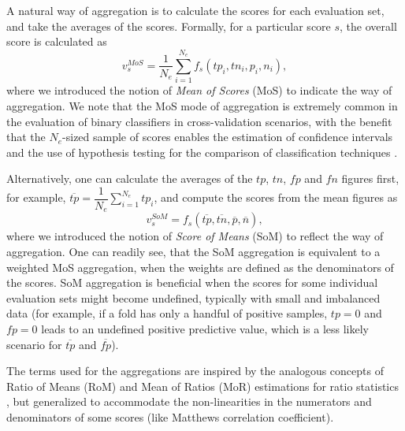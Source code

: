 \documentclass[5p, final]{elsarticle}
\begin{document}
A natural way of aggregation is to calculate the scores for each evaluation set, and take the averages of the scores. Formally, for a particular score $s$, the overall score is calculated as
\begin{equation}
\label{estmor}
v_s^{MoS} = \dfrac{1}{N_e}\sum\limits_{i=1}^{N_e} f_s(tp_{i}, tn_{i}, p_{i}, n_{i}),
\end{equation}
where we introduced the notion of \emph{Mean of Scores} (MoS) to indicate the way of aggregation. We note that the MoS mode of aggregation is extremely common in the evaluation of binary classifiers in cross-validation scenarios, with the benefit that the $N_e$-sized sample of scores enables the estimation of confidence intervals \cite{morex2} and the use of  hypothesis testing for the comparison of classification techniques \cite{morex0}.

Alternatively, one can calculate the averages of the $tp$, $tn$, $fp$ and $fn$ figures first, for example, $\overline{tp} = \dfrac{1}{N_e}\sum\limits_{i=1}^{N_e} tp_i$, and compute the scores from the mean figures as
\begin{equation}
\label{estrom}
v_s^{SoM} = f_s\left(\overline{tp}, \overline{tn}, \overline{p}, \overline{n}\right),
\end{equation}
where we introduced the notion of \emph{Score of Means} (SoM) to reflect the way of aggregation. One can readily see, that the SoM aggregation is equivalent to a weighted MoS aggregation, when the weights are defined as the denominators of the scores. SoM aggregation is beneficial when the scores for some individual evaluation sets might become undefined, typically with small and imbalanced data \cite{romex0} (for example, if a fold has only a handful of positive samples, $tp=0$ and $fp=0$ leads to an undefined positive predictive value, which is a less likely scenario for $\overline{tp}$ and $\overline{fp}$).

The terms used for the aggregations are inspired by the analogous concepts of Ratio of Means (RoM) and Mean of Ratios (MoR) estimations for ratio statistics \cite{rommor, rommor2}, but generalized to accommodate the non-linearities in the numerators and denominators of some scores (like Matthews correlation coefficient).
\end{document}
